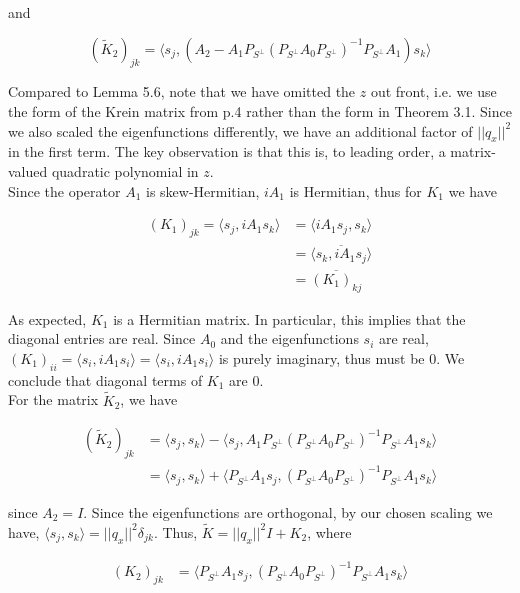 \documentclass[12pt]{article}
\begin{document}
and

\begin{equation}
(\tilde{K}_2)_{jk} = \langle s_j, (A_2 - A_1 P_{S^\perp} (P_{S^\perp} A_0 P_{S^\perp})^{-1} P_{S^\perp} A_1 ) s_k  \rangle
\end{equation}

Compared to Lemma 5.6, note that we have omitted the $z$ out front, i.e. we use the form of the Krein matrix from p.4 rather than the form in Theorem 3.1. Since we also scaled the eigenfunctions differently, we have an additional factor of $||q_x||^2$ in the first term. The key observation is that this is, to leading order, a matrix-valued quadratic polynomial in $z$.\\

Since the operator $A_1$ is skew-Hermitian, $i A_1$ is Hermitian, thus for $K_1$ we have

\begin{align*}
(K_1)_{jk} = \langle s_j, i A_1 s_k \rangle &= \langle i A_1 s_j, s_k \rangle \\
&= \overline{ \langle s_k, i A_1 s_j \rangle } \\
&= \overline{ (K_1)_{kj} }
\end{align*}

As expected, $K_1$ is a Hermitian matrix. In particular, this implies that the diagonal entries are real. Since $A_0$ and the eigenfunctions $s_i$ are real, $(K_1)_{ii} = \langle s_i, i A_1 s_i \rangle = \langle s_i, i A_1 s_i \rangle$ is purely imaginary, thus must be 0. We conclude that diagonal terms of $K_1$ are 0.\\

For the matrix $\tilde{K}_2$, we have 

\begin{align*}
(\tilde{K}_2)_{jk} &= \langle s_j, s_k \rangle - \langle s_j, A_1 P_{S^\perp} (P_{S^\perp} A_0 P_{S^\perp})^{-1} P_{S^\perp} A_1 s_k  \rangle \\
&= \langle s_j, s_k \rangle + \langle P_{S^\perp} A_1 s_j, (P_{S^\perp} A_0 P_{S^\perp})^{-1} P_{S^\perp} A_1 s_k  \rangle
\end{align*}

since $A_2 = I$. Since the eigenfunctions are orthogonal, by our chosen scaling we have, $\langle s_j, s_k \rangle = ||q_x||^2 \delta_{jk}$. Thus, $\tilde{K} = ||q_x||^2 I + K_2$, where

\begin{align*}
(K_2)_{jk} &= 
\langle P_{S^\perp} A_1 s_j, (P_{S^\perp} A_0 P_{S^\perp})^{-1} P_{S^\perp} A_1 s_k \rangle
\end{align*}
\end{document}
